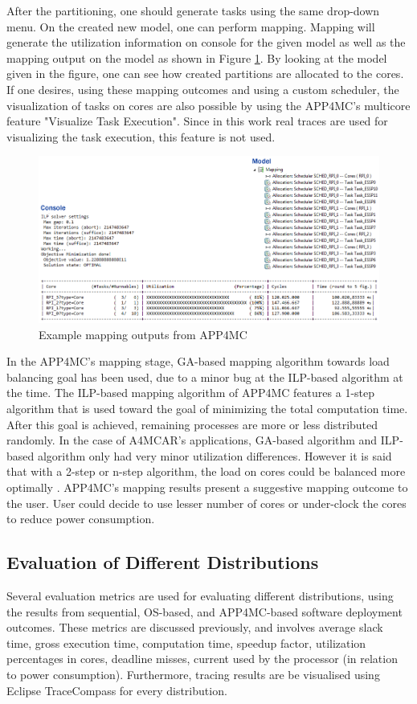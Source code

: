 After the partitioning, one should generate tasks using the same drop-down menu. On the created new model, one can perform mapping. Mapping will generate the utilization information on console for the given model as well as the mapping output on the model as shown in Figure \ref{fig:mappings}. By looking at the model given in the figure, one can see how created partitions are allocated to the cores. If one desires, using these mapping outcomes and using a custom scheduler, the visualization of tasks on cores are also possible by using the APP4MC's multicore feature "Visualize Task Execution". Since in this work real traces are used for visualizing the task execution, this feature is not used.

\begin{figure}[!ht]
	\centering
	\includegraphics[width=\textwidth]{content/images/mappings.png}
	\caption{Example mapping outputs from APP4MC}
	\label{fig:mappings}
\end{figure}

In the APP4MC's mapping stage, GA-based mapping algorithm towards load balancing goal has been used, due to a minor bug at the ILP-based algorithm at the time. The ILP-based mapping algorithm of APP4MC features a 1-step algorithm that is used toward the goal of minimizing the total computation time. After this goal is achieved, remaining processes are more or less distributed randomly. In the case of A4MCAR's applications, GA-based algorithm and ILP-based algorithm only had very minor utilization differences. However it is said that with a 2-step or n-step algorithm, the load on cores could be balanced more optimally \cite{mappingbook}. APP4MC's mapping results present a suggestive mapping outcome to the user. User could decide to use lesser number of cores or under-clock the cores to reduce power consumption.

\subsection{Evaluation of Different Distributions}
Several evaluation metrics are used for evaluating different distributions, using the results from sequential, OS-based, and APP4MC-based software deployment outcomes. These metrics are discussed previously, and involves average slack time, gross execution time, computation time, speedup factor, utilization percentages in cores, deadline misses, current used by the processor (in relation to power consumption).  Furthermore, tracing results are be visualised using Eclipse TraceCompass for every distribution.

